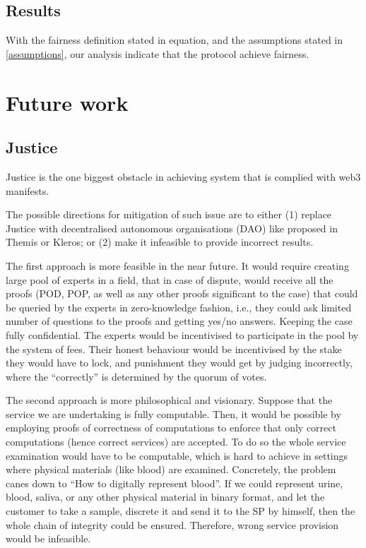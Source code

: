 \documentclass{ieeeaccess}
\begin{document}
\subsection{Results}\label{results}

With the fairness definition stated in equation, and the assumptions
stated in \ref{assumptions}, our analysis indicate that the protocol
achieve fairness.



\section{Future work}
\subsection{Justice}\label{justice}

Justice is the one biggest obstacle in achieving system that is complied
with web3 manifests.

The possible directions for mitigation of such issue are to either (1)
replace Justice with decentralised autonomous organisations (DAO) like
proposed in Themis\cite{meng2019themis} or
Kleros\cite{lesaege2018kleros}; or (2) make it infeasible to provide
incorrect results.

The first approach is more feasible in the near future. It would require
creating large pool of experts in a field, that in case of dispute,
would receive all the proofs (POD, POP, as well as any other proofs
significant to the case) that could be queried by the experts in
zero-knowledge fashion, i.e., they could ask limited number of questions
to the proofs and getting yes/no answers. Keeping the case fully
confidential. The experts would be incentivised to participate in the
pool by the system of fees. Their honest behaviour would be incentivised
by the stake they would have to lock, and punishment they would get by
judging incorrectly, where the ``correctly'' is determined by the quorum
of votes.

The second approach is more philosophical and visionary. Suppose that
the service we are undertaking is fully computable. Then, it would be
possible by employing proofs of correctness of
computations\cite{ben2013snarks} to enforce that only correct
computations (hence correct services) are accepted. To do so the whole
service examination would have to be computable, which is hard to
achieve in settings where physical materials (like blood) are examined.
Concretely, the problem canes down to ``How to digitally represent
blood''. If we could represent urine, blood, saliva, or any other
physical material in binary format, and let the customer to take a
sample, discrete it and send it to the SP by himself, then the whole
chain of integrity could be ensured. Therefore, wrong service provision
would be infeasible.
\end{document}
